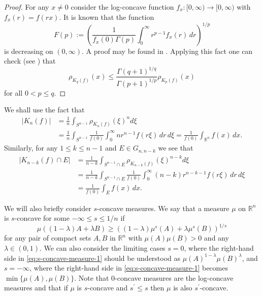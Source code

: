 \documentclass[11pt,leqno]{article}
\theoremstyle{definition}
\theoremstyle{remark}
\numberwithin{equation}{section}
\newcommand{\ls}{\leqslant}
\newcommand{\gr}{\geqslant}
\newcommand{\1}{\textbf{1}}
\begin{document}
\begin{proof}For any $x\neq 0$ consider the log-concave function $f_x:[0,\infty)\to [0,\infty)$ with $f_x(r)=f(rx)$. It is known that
the function
$$F(p):=\left(\frac{1}{f_x(0)\Gamma(p)}\int_0^{\infty}r^{p-1}f_x(r)\,dr\right)^{1/p}$$
is decreasing on $(0,\infty)$. A proof may be found in \cite[Theorem~2.2.3]{BGVV-book}. Applying this fact one can check (see \cite[Proposition~2.5.7]{BGVV-book}) that
$$\rho_{K_q(f)}(x)\ls\frac{\Gamma(q+1)^{1/q}}{\Gamma(p+1)^{1/p}}\rho_{K_p(f)}(x)$$
for all $0<p\ls q$.\end{proof}

We shall use the fact that
\begin{align}\label{eq:quotient-1}
|K_n(f)| &=\frac{1}{n}\int_{S^{n-1}}\rho_{K_n(f)}(\xi)^nd\xi\\
\nonumber &=\frac{1}{n}\int_{S^{n-1}}\frac{1}{f(0)}\int_0^{\infty}nr^{n-1}f(r\xi)\,dr\,d\xi
=\frac{1}{f(0)}\int_{{\mathbb R}^n}f(x)\,dx.
\end{align}
Similarly, for any $1\ls k\ls n-1$ and $E\in G_{n,n-k}$ we see that
\begin{align}\label{eq:quotient-2}
|K_{n-k}(f)\cap E| &=\frac{1}{n-k}\int_{S^{n-1}\cap E}
\rho_{K_{n-k}(f)}(\xi)^{n-k}d\xi\\
\nonumber &=\frac{1}{n-k}\int_{S^{n-1}\cap E}\frac{1}{f(0)}\int_0^{\infty}(n-k)r^{n-k-1}f(r\xi)\,dr\,d\xi \\
\nonumber &=\frac{1}{f(0)}\int_Ef(x)\,dx.
\end{align}

We will also briefly consider $s$-concave measures. We say that a measure $\mu $ on
${\mathbb R}^n$ is $s$-concave for some $-\infty\ls s\ls 1/n$ if
\begin{equation}\label{eq:s-concave-measure-1}\mu ((1-\lambda )A+\lambda B)\gr
((1-\lambda )\mu^{s}(A)+\lambda \mu^{s}(B))^{1/s}\end{equation}
for any pair of compact sets $A,B$ in ${\mathbb R}^n$ with $\mu (A)\mu (B)>0$ and any $\lambda\in (0,1)$.
We can also consider the limiting cases $s =0$, where the right-hand side in \eqref{eq:s-concave-measure-1}
should be understood as $\mu(A)^{1-\lambda }\mu (B)^{\lambda }$, and $s=-\infty $, where the right-hand side in \eqref{eq:s-concave-measure-1} becomes $\min\{\mu (A),\mu (B)\}$. Note that $0$-concave measures are the log-concave
measures and that if $\mu $ is $s$-concave and $s^{\prime}\ls s$ then $\mu $ is also $s^{\prime}$-concave.
\end{document}
